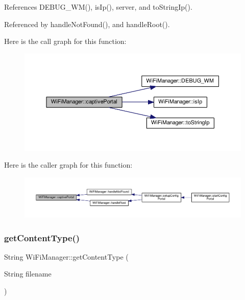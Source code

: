 References D\+E\+B\+U\+G\+\_\+\+W\+M(), is\+Ip(), server, and to\+String\+Ip().



Referenced by handle\+Not\+Found(), and handle\+Root().

Here is the call graph for this function\+:
\nopagebreak
\begin{figure}[H]
\begin{center}
\leavevmode
\includegraphics[width=350pt]{d4/dc8/class_wi_fi_manager_a4ef4298deb224212e5242c456669a973_cgraph}
\end{center}
\end{figure}
Here is the caller graph for this function\+:
\nopagebreak
\begin{figure}[H]
\begin{center}
\leavevmode
\includegraphics[width=350pt]{d4/dc8/class_wi_fi_manager_a4ef4298deb224212e5242c456669a973_icgraph}
\end{center}
\end{figure}
\mbox{\label{class_wi_fi_manager_a40f123fd290c3e331c9785d19a88f3b8}} 
\subsubsection{\texorpdfstring{get\+Content\+Type()}{getContentType()}}
{\footnotesize\ttfamily String Wi\+Fi\+Manager\+::get\+Content\+Type (\begin{DoxyParamCaption}\item[{String}]{filename }\end{DoxyParamCaption})\hspace{0.3cm}{\ttfamily [private]}}



